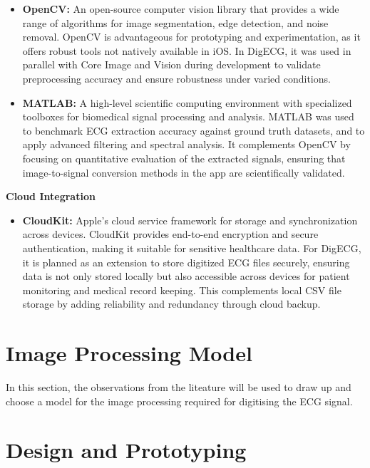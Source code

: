 \begin{itemize}
    \item \textbf{OpenCV:} An open-source computer vision library that provides a wide range of algorithms for image segmentation, edge detection, and noise removal. OpenCV is advantageous for prototyping and experimentation, as it offers robust tools not natively available in iOS. In DigECG, it was used in parallel with Core Image and Vision during development to validate preprocessing accuracy and ensure robustness under varied conditions.
    \item \textbf{MATLAB:} A high-level scientific computing environment with specialized toolboxes for biomedical signal processing and analysis. MATLAB was used to benchmark ECG extraction accuracy against ground truth datasets, and to apply advanced filtering and spectral analysis. It complements OpenCV by focusing on quantitative evaluation of the extracted signals, ensuring that image-to-signal conversion methods in the app are scientifically validated.  
\end{itemize}

\textbf{Cloud Integration}

\begin{itemize}
    \item \textbf{CloudKit:} Apple’s cloud service framework for storage and synchronization across devices. CloudKit provides end-to-end encryption and secure authentication, making it suitable for sensitive healthcare data. For DigECG, it is planned as an extension to store digitized ECG files securely, ensuring data is not only stored locally but also accessible across devices for patient monitoring and medical record keeping. This complements local CSV file storage by adding reliability and redundancy through cloud backup.  
\end{itemize}

\section{Image Processing Model}

In this section, the observations from the liteature will be used to draw up and choose a model for the image processing required for digitising the ECG signal.


\section{Design and Prototyping}

